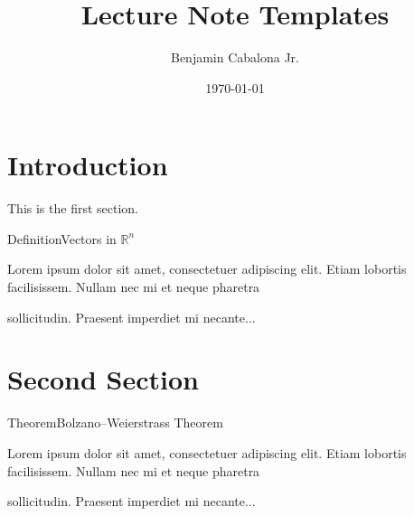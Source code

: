 \documentclass{article}
\title{Lecture Note Templates}
\author{Benjamin Cabalona Jr.}
\date{\today}
\begin{document}
\maketitle

\tableofcontents

\newpage

\section{Introduction}



This is the first section.

\lipsum[1-4] \newline

\begin{DefinitionBox}[]{Definition}{Vectors in $\mathbb{R}^n$}
    
    Lorem ipsum dolor sit amet, consectetuer adipiscing elit.  
    Etiam lobortis facilisissem.  Nullam nec mi et neque pharetra 
    
    sollicitudin.  Praesent imperdiet mi necante...
\end{DefinitionBox}

\section{Second Section}

\lipsum[1] \newline

\begin{TheoremBox}{Theorem}{Bolzano–Weierstrass Theorem}
    
    Lorem ipsum dolor sit amet, consectetuer adipiscing elit.  
    Etiam lobortis facilisissem.  Nullam nec mi et neque pharetra 
    
    sollicitudin.  Praesent imperdiet mi necante...
\end{TheoremBox}
\end{document}
